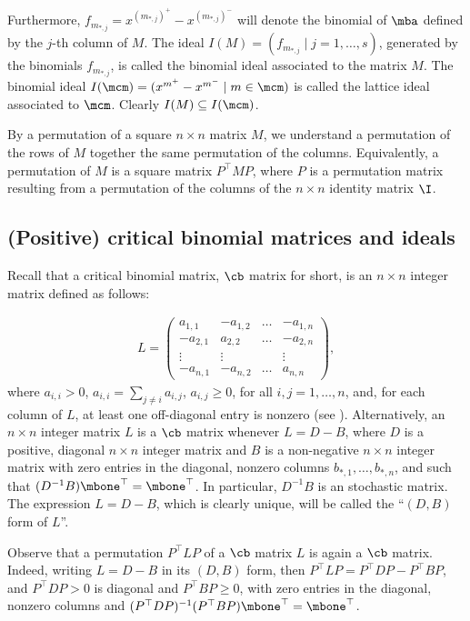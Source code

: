 Furthermore, $f_{m_{*,j}}=x^{(m_{*,j})^+}-x^{(m_{*,j})^-}$ will denote
the binomial of $\mba$ defined by the $j$-th column of $M$. The ideal
$I(M)=(f_{m_{*,j}}\mid j=1,\ldots ,s)$, generated by the binomials
$f_{m_{*,j}}$, is called the binomial ideal associated to the matrix
$M$. The binomial ideal $I(\mcm)=(x^{m^+}-x^{m^-}\mid m\in\mcm)$ is
called the lattice ideal associated to $\mcm$. Clearly $I(M)\subseteq
I(\mcm)$.

By a permutation of a square $n\times n$ matrix $M$, we understand a
permutation of the rows of $M$ together the same permutation of the
columns. Equivalently, a permutation of $M$ is a square matrix
$P^{\top}MP$, where $P$ is a permutation matrix resulting from a
permutation of the columns of the $n\times n$ identity matrix $\I$.

\subsection{(Positive) critical binomial matrices and ideals}
\label{pcbcb}%

 Recall that a critical binomial matrix, $\cb$ matrix for
short, is an $n\times n$ integer matrix defined as follows:

\begin{eqnarray}\label{cbmatrix}
L=\left(\begin{array}{rrrr}
a_{1,1}&-a_{1,2}&\ldots&-a_{1,n}\\
-a_{2,1}&a_{2,2}&\ldots&-a_{2,n}\\
\vdots\phantom{+}&\vdots\phantom{+}&&\vdots\phantom{+}\\
-a_{n,1}&-a_{n,2}&\ldots&a_{n,n}
\end{array}\right),
\end{eqnarray}
where $a_{i,i}>0$, $a_{i,i}=\sum_{j\neq i}a_{i,j}$, $a_{i,j}\geq 0$,
for all $i,j=1,\ldots ,n$, and, for each column of $L$, at least one
off-diagonal entry is nonzero (see \cite{opv}). Alternatively, an
$n\times n$ integer matrix $L$ is a $\cb$ matrix whenever $L=D-B$,
where $D$ is a positive, diagonal $n\times n$ integer matrix and $B$
is a non-negative $n\times n$ integer matrix with zero entries in the
diagonal, nonzero columns $b_{*,1},\ldots ,b_{*,n}$, and such that
$(D^{-1}B)\mbone^{\top}=\mbone^{\top}$. In particular, $D^{-1}B$ is an
stochastic matrix. The expression $L=D-B$, which is clearly unique,
will be called the ``$(D,B)$ form of $L$''.

Observe that a permutation $P^{\top}LP$ of a $\cb$ matrix $L$ is again
a $\cb$ matrix. Indeed, writing $L=D-B$ in its $(D,B)$ form, then
$P^{\top}LP=P^{\top}DP-P^{\top}BP$, and $P^{\top}DP>0$ is diagonal and
$P^{\top}BP\geq 0$, with zero entries in the diagonal, nonzero columns
and $(P^{\top}DP)^{-1}(P^{\top}BP)\mbone^{\top}=\mbone^{\top}$.

